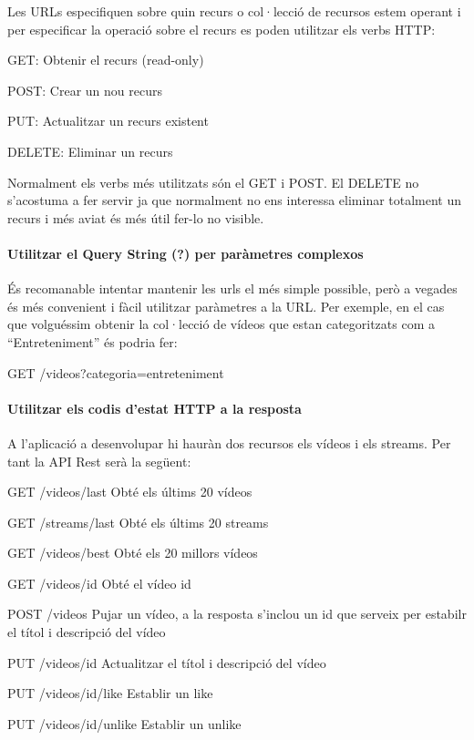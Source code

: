\documentclass[12pt, titlepage]{article}
\begin{document}
Les URLs especifiquen sobre quin recurs o col·lecció de recursos estem operant i
per especificar la operació sobre el recurs es poden utilitzar els verbs HTTP:

GET: Obtenir el recurs (read-only)

POST: Crear un nou recurs

PUT: Actualitzar un recurs existent

DELETE: Eliminar un recurs

Normalment els verbs més utilitzats són el GET i POST. El DELETE no s’acostuma a
fer servir ja que normalment no ens interessa eliminar totalment un recurs i més
aviat és més útil fer-lo no visible.

\paragraph{Utilitzar el Query String (?) per paràmetres complexos}

És recomanable intentar mantenir les urls el més simple possible, però a vegades
és més convenient i fàcil utilitzar paràmetres a la URL. Per exemple, en el cas
que volguéssim obtenir la col·lecció de vídeos que estan categoritzats com a
“Entreteniment” és podria fer:

GET /videos?categoria=entreteniment

\paragraph{Utilitzar els codis d’estat HTTP a la resposta}

A l’aplicació a desenvolupar hi hauràn dos recursos els vídeos i els streams.
Per tant la API Rest serà la següent:

GET /videos/last \textrightarrow Obté els últims 20 vídeos

GET /streams/last \textrightarrow Obté els últims 20 streams

GET /videos/best \textrightarrow Obté els 20 millors vídeos

GET /videos/{id} \textrightarrow Obté el vídeo {id}

POST /videos      \textrightarrow Pujar un vídeo, a la resposta s’inclou un id que serveix per estabilr el títol i descripció del vídeo

PUT /videos/{id} \textrightarrow Actualitzar el títol i descripció del vídeo

PUT /videos/{id}/like  \textrightarrow Establir un like

PUT /videos/{id}/unlike \textrightarrow Establir un unlike
\end{document}
